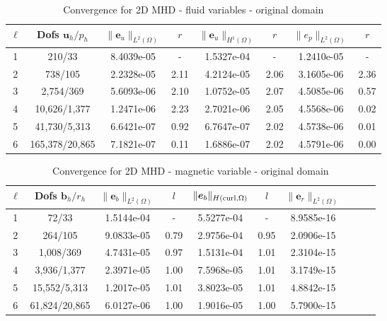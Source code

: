 \documentclass{article}
\newcommand{\uu}[1]{\boldsymbol #1}
\begin{document}
\begin{table}[h!]
\begin{center}
\begin{tabular}{cccccccc}
\hline \hline

$\ell$ &    Dofs $\uu{u}_h/p_h$ & $\|\uu{e}_u\|_{L^2(\Omega)}$ & $r$ & $\|\uu{e}_u\|_{H^1(\Omega)}$ & $r$ &$\|e_p\|_{L^2(\Omega)}$ & $r$  \\
\hline
\hline
1 &     210/33 &  8.4039e-05 &     - &  1.5327e-04 &     - &  1.2410e-05 &      - \\
2 &     738/105 &  2.2328e-05 &     2.11 &  4.2124e-05 &     2.06 &  3.1605e-06 &      2.36 \\
3 &    2,754/369 &  5.6093e-06 &     2.10 &  1.0752e-05 &     2.07 &  4.5085e-06 &      0.57 \\
4 &   10,626/1,377 &  1.2471e-06 &     2.23 &  2.7021e-06 &     2.05 &  4.5568e-06 &      0.02 \\
5 &   41,730/5,313 &  6.6421e-07 &     0.92 &  6.7647e-07 &     2.02 &  4.5738e-06 &      0.01 \\
6 &  165,378/20,865 &  7.1821e-07 &     0.11 &  1.6886e-07 &     2.02 &  4.5791e-06 &      0.00 \\

\hline\hline
\end{tabular}

\caption{Convergence for 2D MHD - fluid variables - original domain}
\label{tab:MHD_2D_smooth_fluids_velocity}
\end{center}
\end{table}



\begin{table}[h!]
\begin{center}
\begin{tabular}{cccccccccc}
\hline
\hline
$\ell$ &    Dofs $\uu{b}_h/r_h$ & $\|\uu{e}_b\|_{L^2(\Omega)}$ & $l$ & $\|\uu{e}_b\|_{H({\rm curl},\Omega)}$ & $l$ &$\|\uu{e}_r\|_{L^2(\Omega)}$ \\
\hline\hline

1 &     72/33 &  1.5144e-04 &     - &  5.5277e-04 &        - &   8.9585e-16\\
2 &    264/105 &  9.0833e-05 &     0.79 &  2.9756e-04 &        0.95 &   2.0906e-15\\
3 &   1,008/369 &  4.7431e-05 &     0.97 &  1.5131e-04 &        1.01 &   2.3104e-15\\
4 &   3,936/1,377 &  2.3971e-05 &     1.00 &  7.5968e-05 &        1.01 &   3.1749e-15\\
5 &  15,552/5,313 &  1.2017e-05 &     1.01 &  3.8023e-05 &        1.01 &   4.8842e-15\\
6 &  61,824/20,865 &  6.0127e-06 &     1.00 &  1.9016e-05 &        1.00 &   5.7900e-15\\
\hline\hline

\end{tabular}
\caption{Convergence for 2D MHD  - magnetic variable - original domain}
\label{tab:MHD_2D_smooth_magnetic}
\end{center}
\end{table}
\end{document}
